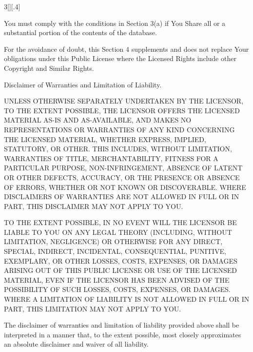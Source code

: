 \documentclass[8pt,cleardoubleempty]{scrbook}
\begin{document}
\begin{multicols}{3}[][.4\paperwidth]
\begin{longenum}
\begin{longenum}
  \item You must comply with the conditions in Section 3(a) if You Share
     all or a substantial portion of the contents of the database.

  \end{longenum}

 For the avoidance of doubt, this Section 4 supplements and does not
 replace Your obligations under this Public License where the Licensed
 Rights include other Copyright and Similar Rights.


 \item Disclaimer of Warranties and Limitation of Liability.

  \begin{longenum}

  \item UNLESS OTHERWISE SEPARATELY UNDERTAKEN BY THE LICENSOR, TO THE
     EXTENT POSSIBLE, THE LICENSOR OFFERS THE LICENSED MATERIAL AS-IS
     AND AS-AVAILABLE, AND MAKES NO REPRESENTATIONS OR WARRANTIES OF
     ANY KIND CONCERNING THE LICENSED MATERIAL, WHETHER EXPRESS,
     IMPLIED, STATUTORY, OR OTHER. THIS INCLUDES, WITHOUT LIMITATION,
     WARRANTIES OF TITLE, MERCHANTABILITY, FITNESS FOR A PARTICULAR
     PURPOSE, NON-INFRINGEMENT, ABSENCE OF LATENT OR OTHER DEFECTS,
     ACCURACY, OR THE PRESENCE OR ABSENCE OF ERRORS, WHETHER OR NOT
     KNOWN OR DISCOVERABLE. WHERE DISCLAIMERS OF WARRANTIES ARE NOT
     ALLOWED IN FULL OR IN PART, THIS DISCLAIMER MAY NOT APPLY TO YOU.

  \item TO THE EXTENT POSSIBLE, IN NO EVENT WILL THE LICENSOR BE LIABLE
     TO YOU ON ANY LEGAL THEORY (INCLUDING, WITHOUT LIMITATION,
     NEGLIGENCE) OR OTHERWISE FOR ANY DIRECT, SPECIAL, INDIRECT,
     INCIDENTAL, CONSEQUENTIAL, PUNITIVE, EXEMPLARY, OR OTHER LOSSES,
     COSTS, EXPENSES, OR DAMAGES ARISING OUT OF THIS PUBLIC LICENSE OR
     USE OF THE LICENSED MATERIAL, EVEN IF THE LICENSOR HAS BEEN
     ADVISED OF THE POSSIBILITY OF SUCH LOSSES, COSTS, EXPENSES, OR
     DAMAGES. WHERE A LIMITATION OF LIABILITY IS NOT ALLOWED IN FULL OR
     IN PART, THIS LIMITATION MAY NOT APPLY TO YOU.

  \item The disclaimer of warranties and limitation of liability provided
     above shall be interpreted in a manner that, to the extent
     possible, most closely approximates an absolute disclaimer and
     waiver of all liability.


\end{longenum}
\end{longenum}
\end{multicols}
\end{document}
